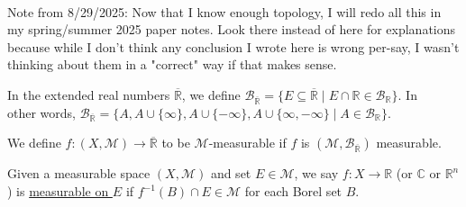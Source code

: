 \documentclass{book}
\newcommand{\hOne}{%
   \color{Black}%
   \fontsize{14}{16}\selectfont%
}
\newcommand{\myComment}{%
   \color{RawerSienna}%
   \fontsize{12}{14}\selectfont%
}
\newcommand{\udefine}[1]{{%
   \setulcolor{Red}%
   \setul{0.14em}{0.07em}%
   \ul{#1}%
}}
\newcommand{\mySepTwo}[1][.]{%
   {\noindent\color{#1}{\rule{6.5in}{0.5mm}}}\\%
}
\newcommand{\retTwo}{\hfill\bigbreak}
\begin{document}
\myComment\mySepTwo

Note from 8/29/2025: Now that I know enough topology, I will redo all this in my spring/summer 2025 paper notes. Look there instead of here for explanations because while I don't think any conclusion I wrote here is wrong per-say, I wasn't thinking about them in a "correct" way if that makes sense.\retTwo

\hOne In the extended real numbers $\overline{\mathbb{R}}$, we define $\mathcal{B}_{\overline{\mathbb{R}}} = \{E \subseteq \overline{\mathbb{R}} \mid E \cap \mathbb{R} \in \mathcal{B}_{\mathbb{R}}\}$. In\\ other words, $\mathcal{B}_{\overline{\mathbb{R}}} = \{A, A \cup\{\infty\}, A \cup\{-\infty\}, A \cup\{\infty, -\infty\} \mid A \in \mathcal{B}_{\mathbb{R}} \}$.\retTwo

We define $f: (X, \mathcal{M}) \longrightarrow \overline{\mathbb{R}}$ to be $\mathcal{M}$-measurable if $f$ is $(\mathcal{M}, \mathcal{B}_{\overline{\mathbb{R}}})$ measurable.\retTwo

Given a measurable space $(X, \mathcal{M})$ and set $E \in \mathcal{M}$, we say $f: X \longrightarrow \mathbb{R}$ (or $\mathbb{C}$ or $\mathbb{R}^n$) is \udefine{measurable on $E$} if $f^{-1}(B) \cap E \in \mathcal{M}$ for each Borel set $B$.\retTwo
\end{document}
